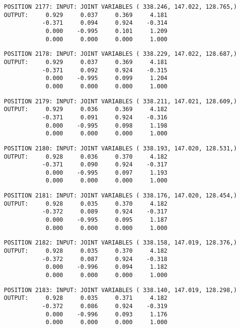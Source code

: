 \begin{verbatim}
POSITION 2177: INPUT: JOINT VARIABLES ( 338.246, 147.022, 128.765,)
OUTPUT:     0.929     0.037     0.369     4.181
           -0.371     0.094     0.924    -0.314
            0.000    -0.995     0.101     1.209
            0.000     0.000     0.000     1.000
\end{verbatim} \pagebreak[1]\begin{verbatim}
POSITION 2178: INPUT: JOINT VARIABLES ( 338.229, 147.022, 128.687,)
OUTPUT:     0.929     0.037     0.369     4.181
           -0.371     0.092     0.924    -0.315
            0.000    -0.995     0.099     1.204
            0.000     0.000     0.000     1.000
\end{verbatim} \pagebreak[1]\begin{verbatim}
POSITION 2179: INPUT: JOINT VARIABLES ( 338.211, 147.021, 128.609,)
OUTPUT:     0.929     0.036     0.369     4.182
           -0.371     0.091     0.924    -0.316
            0.000    -0.995     0.098     1.198
            0.000     0.000     0.000     1.000
\end{verbatim} \pagebreak[1]\begin{verbatim}
POSITION 2180: INPUT: JOINT VARIABLES ( 338.193, 147.020, 128.531,)
OUTPUT:     0.928     0.036     0.370     4.182
           -0.371     0.090     0.924    -0.317
            0.000    -0.995     0.097     1.193
            0.000     0.000     0.000     1.000
\end{verbatim} \pagebreak[1]\begin{verbatim}
POSITION 2181: INPUT: JOINT VARIABLES ( 338.176, 147.020, 128.454,)
OUTPUT:     0.928     0.035     0.370     4.182
           -0.372     0.089     0.924    -0.317
            0.000    -0.995     0.095     1.187
            0.000     0.000     0.000     1.000
\end{verbatim} \pagebreak[1]\begin{verbatim}
POSITION 2182: INPUT: JOINT VARIABLES ( 338.158, 147.019, 128.376,)
OUTPUT:     0.928     0.035     0.370     4.182
           -0.372     0.087     0.924    -0.318
            0.000    -0.996     0.094     1.182
            0.000     0.000     0.000     1.000
\end{verbatim} \pagebreak[1]\begin{verbatim}
POSITION 2183: INPUT: JOINT VARIABLES ( 338.140, 147.019, 128.298,)
OUTPUT:     0.928     0.035     0.371     4.182
           -0.372     0.086     0.924    -0.319
            0.000    -0.996     0.093     1.176
            0.000     0.000     0.000     1.000
\end{verbatim} \pagebreak[1]\begin{verbatim}

\end{verbatim}
